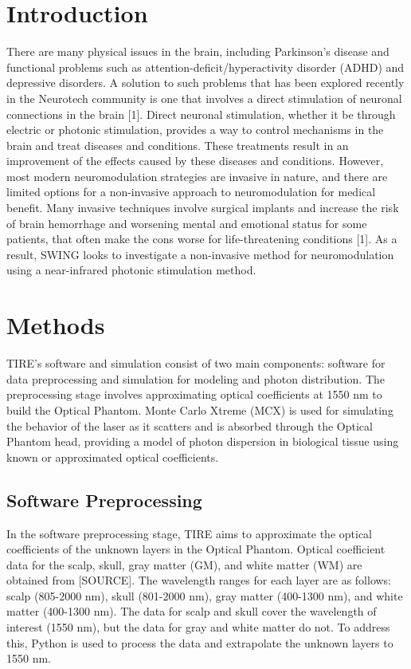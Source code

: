 \documentclass[journal,twoside,web]{ieeecolor}
\begin{document}
\section{Introduction}
\label{sec:introduction}
There are many physical issues in the brain, including Parkinson's disease and functional problems such as attention-deficit/hyperactivity disorder (ADHD)  
and depressive disorders. A solution to such problems that has been explored recently in the Neurotech community is one that involves a direct stimulation of  
neuronal connections in the brain [1]. Direct neuronal stimulation, whether it be through electric or photonic stimulation, provides a way to control  
mechanisms in the brain and treat diseases and conditions. These treatments result in an improvement of the effects caused by these diseases and conditions.  
However, most modern neuromodulation strategies are invasive in nature, and there are limited options for a non-invasive approach to neuromodulation for medical benefit.  
Many invasive techniques involve surgical implants and increase the risk of brain hemorrhage and worsening mental and emotional status for some patients,  
that often make the cons worse for life-threatening conditions [1]. As a result, SWING looks to investigate a non-invasive method for neuromodulation  
using a near-infrared photonic stimulation method. 

\section{Methods}
\label{sec:methods}
TIRE's software and simulation consist of two main components: software for data preprocessing and simulation for modeling and photon distribution. The preprocessing stage involves approximating optical coefficients at 1550 nm to build the Optical Phantom. Monte Carlo Xtreme (MCX) is used for simulating the behavior of the laser as it scatters and is absorbed through the Optical Phantom head, providing a model of photon dispersion in biological tissue using known or approximated optical coefficients.

\subsection{Software Preprocessing}
In the software preprocessing stage, TIRE aims to approximate the optical coefficients of the unknown layers in the Optical Phantom. Optical coefficient data for the scalp, skull, gray matter (GM), and white matter (WM) are obtained from [SOURCE]. The wavelength ranges for each layer are as follows: scalp (805-2000 nm), skull (801-2000 nm), gray matter (400-1300 nm), and white matter (400-1300 nm). The data for scalp and skull cover the wavelength of interest (1550 nm), but the data for gray and white matter do not. To address this, Python is used to process the data and extrapolate the unknown layers to 1550 nm.
\end{document}
